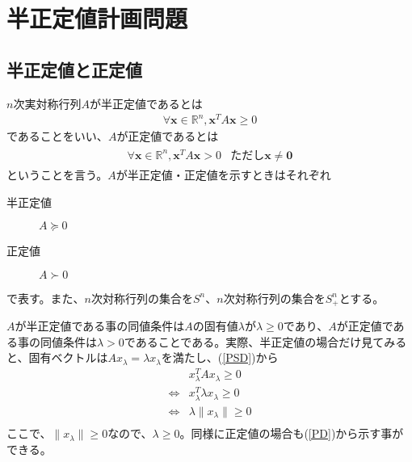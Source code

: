 
\section{半正定値計画問題}
\subsection{半正定値と正定値}
$n$次実対称行列$A$が半正定値であるとは
\begin{align}
  \forall \mathbf{x} \in \mathbb{R}^n, \mathbf{x}^T A \mathbf{x} \geq 0
\end{align} \label{PSD}
であることをいい、$A$が正定値であるとは
\begin{align}
  \begin{array}{ll}
    \forall \mathbf{x} \in \mathbb{R}^n, \mathbf{x}^T A \mathbf{x} > 0 & \text{ただし}\mathbf{x} \not = \mathbf{0}
  \end{array}
\end{align} \label{PD}
ということを言う。$A$が半正定値・正定値を示すときはそれぞれ
\begin{description}
  \item[半正定値] $A \succeq 0$
  \item[正定値]   $A \succ 0$
\end{description}
で表す。また、$n$次対称行列の集合を$S^n$、$n$次対称行列の集合を$S_+^n$とする。

$A$が半正定値である事の同値条件は$A$の固有値$\lambda$が$\lambda \geq 0$であり、$A$が正定値である事の同値条件は$\lambda > 0$であることである。実際、半正定値の場合だけ見てみると、固有ベクトルは$A x_\lambda = \lambda x_\lambda$を満たし、(\ref{PSD})から
\begin{align*}
                  & x_\lambda^T A x_\lambda \geq 0 \\
  \Leftrightarrow & x_\lambda^T \lambda x_\lambda \geq 0 \\
  \Leftrightarrow & \lambda \|x_\lambda\| \geq 0 \\
\end{align*}
ここで、$\|x_\lambda\| \geq 0$なので、$\lambda \geq 0$。同様に正定値の場合も(\ref{PD})から示す事ができる。

